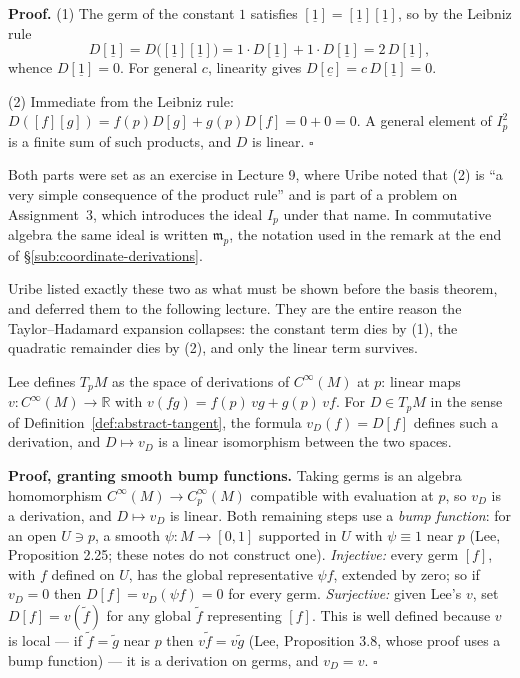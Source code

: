 \documentclass[11pt]{report}
\makeatletter
\newcounter{thmcounter}[section]
\renewenvironment{proof}[1][Proof]{\noindent\textbf{#1.} }{\hfill$\square$\par\vspace{5pt}}
\newcommand{\thmlabel}[1]{\edef\@currentlabel{\arabic{section}.\arabic{thmcounter}}\label{#1}}
\newcommand{\leeref}[1]{\par\smallskip{\raggedleft\footnotesize\textsc{Lee}:\ #1\par}}
\makeatother
\begin{document}
\begin{proof}
(1) The germ of the constant $1$ satisfies $[\underline 1] = [\underline 1][\underline 1]$, so by the Leibniz rule
\[
D[\underline 1] = D\big([\underline 1][\underline 1]\big) = 1 \cdot D[\underline 1] + 1 \cdot D[\underline 1] = 2\, D[\underline 1],
\]
whence $D[\underline 1] = 0$. For general $c$, linearity gives $D[\underline c] = c\, D[\underline 1] = 0$.

(2) Immediate from the Leibniz rule: $D([f][g]) = f(p)D[g] + g(p)D[f] = 0 + 0 = 0$. A general element of $I_p^2$ is a finite sum of such products, and $D$ is linear.
\end{proof}

Both parts were set as an exercise in Lecture 9, where Uribe noted that (2) is ``a very simple consequence of the product rule'' and is part of a problem on Assignment~3, which introduces the ideal $I_p$ under that name. In commutative algebra the same ideal is written $\mathfrak{m}_p$, the notation used in the remark at the end of \S\ref{sub:coordinate-derivations}.

\begin{rembox}\label{rem:abstract-tangent-4}
Uribe listed exactly these two as what must be shown before the basis theorem, and deferred them to the following lecture. They are the entire reason the Taylor--Hadamard expansion collapses: the constant term dies by (1), the quadratic remainder dies by (2), and only the linear term survives.
\end{rembox}

\begin{propbox}\thmlabel{prop:germ-global}
Lee defines $T_pM$ as the space of derivations of $C^\infty(M)$ at $p$: linear maps $v : C^\infty(M) \to \mathbb{R}$ with $v(fg) = f(p)\,vg + g(p)\,vf$. For $D \in T_pM$ in the sense of Definition~\ref{def:abstract-tangent}, the formula $v_D(f) = D[f]$ defines such a derivation, and $D \mapsto v_D$ is a linear isomorphism between the two spaces.
\leeref{Ch.~3, with Propositions 2.25 and 3.8}
\end{propbox}

\begin{proof}[Proof, granting smooth bump functions]
Taking germs is an algebra homomorphism $C^\infty(M) \to C_p^\infty(M)$ compatible with evaluation at $p$, so $v_D$ is a derivation, and $D \mapsto v_D$ is linear. Both remaining steps use a \emph{bump function}: for an open $U \ni p$, a smooth $\psi : M \to [0,1]$ supported in $U$ with $\psi \equiv 1$ near $p$ (Lee, Proposition 2.25; these notes do not construct one). \emph{Injective:} every germ $[f]$, with $f$ defined on $U$, has the global representative $\psi f$, extended by zero; so if $v_D = 0$ then $D[f] = v_D(\psi f) = 0$ for every germ. \emph{Surjective:} given Lee's $v$, set $D[f] = v(\tilde f)$ for any global $\tilde f$ representing $[f]$. This is well defined because $v$ is local --- if $\tilde f = \tilde g$ near $p$ then $v\tilde f = v\tilde g$ (Lee, Proposition 3.8, whose proof uses a bump function) --- it is a derivation on germs, and $v_D = v$.
\end{proof}
\end{document}
